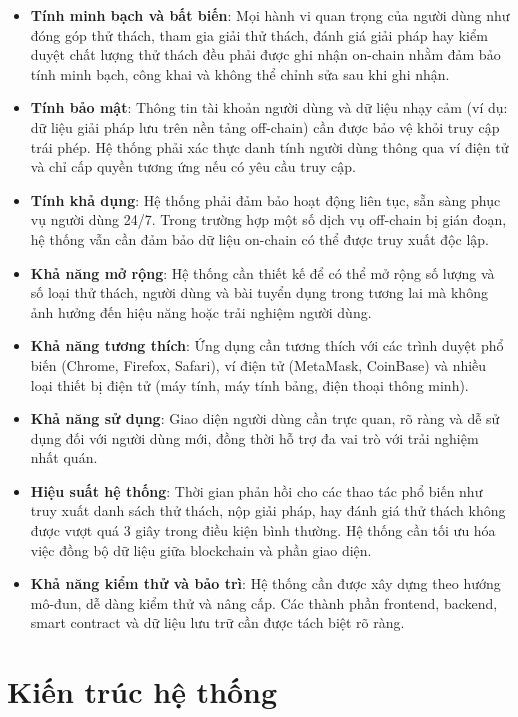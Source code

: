 \begin{itemize}
  \item \textbf{Tính minh bạch và bất biến}: Mọi hành vi quan trọng của người dùng như đóng góp thử thách, tham gia giải thử thách, đánh giá giải pháp hay kiểm duyệt chất lượng thử thách đều phải được ghi nhận on-chain nhằm đảm bảo tính minh bạch, công khai và không thể chỉnh sửa sau khi ghi nhận.
  \item \textbf{Tính bảo mật}: Thông tin tài khoản người dùng và dữ liệu nhạy cảm (ví dụ: dữ liệu giải pháp lưu trên nền tảng off-chain) cần được bảo vệ khỏi truy cập trái phép. Hệ thống phải xác thực danh tính người dùng thông qua ví điện tử và chỉ cấp quyền tương ứng nếu có yêu cầu truy cập.
  \item \textbf{Tính khả dụng}: Hệ thống phải đảm bảo hoạt động liên tục, sẵn sàng phục vụ người dùng 24/7. Trong trường hợp một số dịch vụ off-chain bị gián đoạn, hệ thống vẫn cần đảm bảo dữ liệu on-chain có thể được truy xuất độc lập.
  \item \textbf{Khả năng mở rộng}: Hệ thống cần thiết kế để có thể mở rộng số lượng và số loại thử thách, người dùng và bài tuyển dụng trong tương lai mà không ảnh hưởng đến hiệu năng hoặc trải nghiệm người dùng.
  \item \textbf{Khả năng tương thích}: Ứng dụng cần tương thích với các trình duyệt phổ biến (Chrome, Firefox, Safari), ví điện tử (MetaMask, CoinBase) và nhiều loại thiết bị điện tử (máy tính, máy tính bảng, điện thoại thông minh).
  \item \textbf{Khả năng sử dụng}: Giao diện người dùng cần trực quan, rõ ràng và dễ sử dụng đối với người dùng mới, đồng thời hỗ trợ đa vai trò với trải nghiệm nhất quán.
  \item \textbf{Hiệu suất hệ thống}: Thời gian phản hồi cho các thao tác phổ biến như truy xuất danh sách thử thách, nộp giải pháp, hay đánh giá thử thách không được vượt quá 3 giây trong điều kiện bình thường. Hệ thống cần tối ưu hóa việc đồng bộ dữ liệu giữa blockchain và phần giao diện.
  \item \textbf{Khả năng kiểm thử và bảo trì}: Hệ thống cần được xây dựng theo hướng mô-đun, dễ dàng kiểm thử và nâng cấp. Các thành phần frontend, backend, smart contract và dữ liệu lưu trữ cần được tách biệt rõ ràng.
\end{itemize}

\section{Kiến trúc hệ thống}

